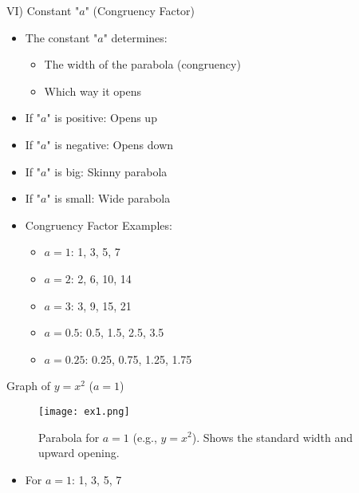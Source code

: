 \documentclass[aspectratio=169]{beamer}
\begin{document}
\begin{frame}{VI) Constant "$a$" (Congruency Factor)}
    \begin{tcolorbox}[colback=lightgray,colframe=primary,title=Key Points]
        \footnotesize
        \begin{itemize}
            \item The constant "$a$" determines:
                \begin{itemize}
                    \item The width of the parabola (congruency)
                    \item Which way it opens
                \end{itemize}
            \item If "$a$" is positive: Opens up
            \item If "$a$" is negative: Opens down
            \item If "$a$" is big: Skinny parabola
            \item If "$a$" is small: Wide parabola
            \item Congruency Factor Examples:
                \begin{itemize}
                    \item $a=1$: 1, 3, 5, 7
                    \item $a=2$: 2, 6, 10, 14
                    \item $a=3$: 3, 9, 15, 21
                    \item $a=0.5$: 0.5, 1.5, 2.5, 3.5
                    \item $a=0.25$: 0.25, 0.75, 1.25, 1.75
                \end{itemize}
        \end{itemize}
    \end{tcolorbox}
\end{frame}

\begin{frame}{Graph of $y = x^2$ ($a=1$)}
    \begin{figure}[H]
        \centering
        \texttt{[image: ex1.png]}
        \caption{Parabola for $a=1$ (e.g., $y=x^2$). Shows the standard width and upward opening.}
    \end{figure}
    \begin{tcolorbox}[colback=lightgray,colframe=primary,title=Congruency Pattern]
        \footnotesize
        \begin{itemize}
            \item For $a=1$: 1, 3, 5, 7
        \end{itemize}
    \end{tcolorbox}
\end{frame}
\end{document}
